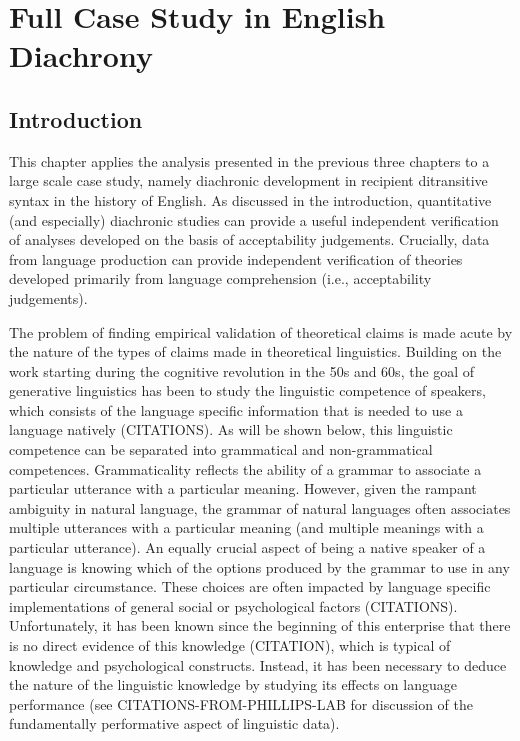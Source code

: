 \chapter{Full Case Study in English Diachrony}
\section{Introduction}
This chapter applies the analysis presented in the previous three chapters to a large scale case study, namely diachronic development in recipient ditransitive syntax in the history of English. As discussed in the introduction, quantitative (and especially) diachronic studies can provide a useful independent verification of analyses developed on the basis of acceptability judgements. Crucially, data from language production can provide independent verification of theories developed primarily from language comprehension (i.e., acceptability judgements).

The problem of finding empirical validation of theoretical claims is made acute by the nature of the types of claims made in theoretical linguistics. Building on the work starting during the cognitive revolution in the 50s and 60s, the goal of generative linguistics has been to study the linguistic competence of speakers, which consists of the language specific information that is needed to use a language natively (CITATIONS). As will be shown below, this linguistic competence can be separated into grammatical and non-grammatical competences. Grammaticality reflects the ability of a grammar to associate a particular utterance with a particular meaning. However, given the rampant ambiguity in natural language, the grammar of natural languages often associates multiple utterances with a particular meaning (and multiple meanings with a particular utterance). An equally crucial aspect of being a native speaker of a language is knowing which of the options produced by the grammar to use in any particular circumstance. These choices are often impacted by language specific implementations of general social or psychological factors (CITATIONS). Unfortunately, it has been known since the beginning of this enterprise that there is no direct evidence of this knowledge (CITATION), which is typical of knowledge and psychological constructs. Instead, it has been necessary to deduce the nature of the linguistic knowledge by studying its effects on language performance (see CITATIONS-FROM-PHILLIPS-LAB for discussion of the fundamentally performative aspect of linguistic data).

